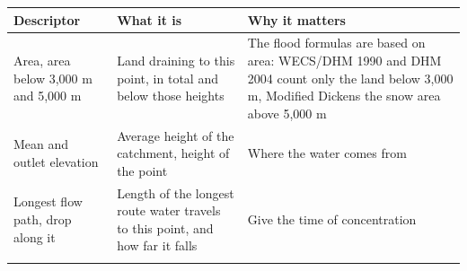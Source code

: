 \documentclass[
  10pt,
]{article}
\begin{document}
\begin{longtable}[]{@{}lll@{}}
\toprule
\begin{minipage}[b]{0.30\columnwidth}\raggedright
Descriptor\strut
\end{minipage} & \begin{minipage}[b]{0.30\columnwidth}\raggedright
What it is\strut
\end{minipage} & \begin{minipage}[b]{0.30\columnwidth}\raggedright
Why it matters\strut
\end{minipage}\tabularnewline
\midrule
\endhead
\begin{minipage}[t]{0.30\columnwidth}\raggedright
Area, area below 3,000 m and 5,000 m\strut
\end{minipage} & \begin{minipage}[t]{0.30\columnwidth}\raggedright
Land draining to this point, in total and below those heights\strut
\end{minipage} & \begin{minipage}[t]{0.30\columnwidth}\raggedright
The flood formulas are based on area: WECS/DHM 1990 and DHM 2004 count
only the land below 3,000 m, Modified Dickens the snow area above 5,000
m\strut
\end{minipage}\tabularnewline
\begin{minipage}[t]{0.30\columnwidth}\raggedright
Mean and outlet elevation\strut
\end{minipage} & \begin{minipage}[t]{0.30\columnwidth}\raggedright
Average height of the catchment, height of the point\strut
\end{minipage} & \begin{minipage}[t]{0.30\columnwidth}\raggedright
Where the water comes from\strut
\end{minipage}\tabularnewline
\begin{minipage}[t]{0.30\columnwidth}\raggedright
Longest flow path, drop along it\strut
\end{minipage} & \begin{minipage}[t]{0.30\columnwidth}\raggedright
Length of the longest route water travels to this point, and how far it
falls\strut
\end{minipage} & \begin{minipage}[t]{0.30\columnwidth}\raggedright
Give the time of concentration\strut
\end{minipage}\tabularnewline
\begin{minipage}[t]{0.30\columnwidth}\raggedright

\end{minipage}
\end{longtable}
\end{document}
